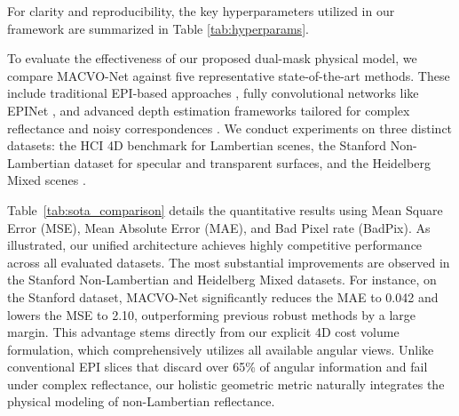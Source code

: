 \documentclass[lettersize,journal]{IEEEtran}
\begin{document}
For clarity and reproducibility, the key hyperparameters utilized in our framework are summarized in Table \ref{tab:hyperparams}.

\begin{table}[htbp]
    \centering
    \caption{Summary of Key Hyperparameters}
    \label{tab:hyperparams}
\end{table}

To evaluate the effectiveness of our proposed dual-mask physical model, we compare MACVO-Net against five representative state-of-the-art methods. These include traditional EPI-based approaches \cite{wanner2014}, fully convolutional networks like EPINet \cite{heber2018}, and advanced depth estimation frameworks tailored for complex reflectance and noisy correspondences \cite{lyu2022, zhang2023, wang2023}. We conduct experiments on three distinct datasets: the HCI 4D benchmark \cite{honauer2016} for Lambertian scenes, the Stanford Non-Lambertian dataset \cite{zhang2023} for specular and transparent surfaces, and the Heidelberg Mixed scenes \cite{wang2023}. 

Table~\ref{tab:sota_comparison} details the quantitative results using Mean Square Error (MSE), Mean Absolute Error (MAE), and Bad Pixel rate (BadPix). As illustrated, our unified architecture achieves highly competitive performance across all evaluated datasets. The most substantial improvements are observed in the Stanford Non-Lambertian and Heidelberg Mixed datasets. For instance, on the Stanford dataset, MACVO-Net significantly reduces the MAE to 0.042 and lowers the MSE to 2.10, outperforming previous robust methods by a large margin. This advantage stems directly from our explicit 4D cost volume formulation, which comprehensively utilizes all available angular views. Unlike conventional EPI slices that discard over 65\% of angular information and fail under complex reflectance, our holistic geometric metric naturally integrates the physical modeling of non-Lambertian reflectance.
\end{document}
